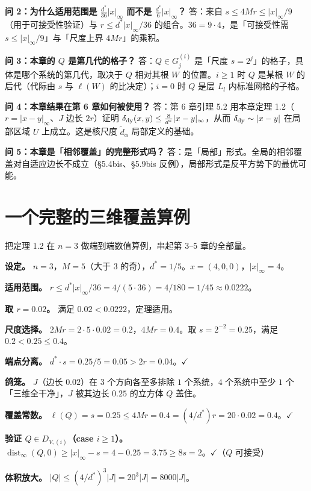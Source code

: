 \documentclass[a4paper,11pt,openany]{ctexbook}
\numberwithin{equation}{chapter}
\numberwithin{figure}{chapter}
\numberwithin{table}{chapter}
\begin{document}
\textbf{问 2：为什么适用范围是 $\frac{d^*}{36}|x|_\infty$ 而不是 $\frac{d^*}{6}|x|_\infty$？} 答：来自 $s\le4Mr\le|x|_\infty/9$（用于可接受性验证）与 $r\le d^*|x|_\infty/36$ 的组合。$36=9\cdot4$，是「可接受性需 $s\le|x|_\infty/9$」与「尺度上界 $4Mr$」的乘积。

\textbf{问 3：本章的 $Q$ 是第几代的格子？} 答：$Q\in G_j^{(i)}$ 是「尺度 $s=2^j$」的格子，具体是哪个系统的第几代，取决于 $Q$ 相对其根 $W$ 的位置。$i\ge1$ 时 $Q$ 是某根 $W$ 的后代（代际由 $s$ 与 $\ell(W)$ 的比决定）；$i=0$ 时 $Q$ 是层 $L_l$ 内标准网格的子格。

\textbf{问 4：本章结果在第 6 章如何被使用？} 答：第 6 章引理 5.2 用本章定理 1.2（$r=|x-y|_\infty$、$J$ 边长 $2r$）证明 $\delta_{\rm dy}(x,y)\le\frac8{d^*}|x-y|_\infty$，从而 $\delta_{\rm dy}\sim|x-y|$ 在局部区域 $U$ 上成立。这是核尺度 $\widetilde d_\alpha$ 局部定义的基础。

\textbf{问 5：本章是「相邻覆盖」的完整形式吗？} 答：是「局部」形式。全局的相邻覆盖对自适应边长不成立（§5.4bis、§5.9bis 反例），局部形式是反平方势下的最优可能。

\section{一个完整的三维覆盖算例}

把定理 1.2 在 $n=3$ 做端到端数值算例，串起第 3–5 章的全部量。

\textbf{设定。} $n=3$，$M=5$（大于 $3$ 的奇），$d^*=1/5$。$x=(4,0,0)$，$|x|_\infty=4$。

\textbf{适用范围。} $r\le d^*|x|_\infty/36=4/(5\cdot36)=4/180=1/45\approx0.0222$。

\textbf{取 $r=0.02$。} 满足 $0.02<0.0222$，定理适用。

\textbf{尺度选择。} $2Mr=2\cdot5\cdot0.02=0.2$，$4Mr=0.4$。取 $s=2^{-2}=0.25$，满足 $0.2<0.25\le0.4$。

\textbf{端点分离。} $d^*\cdot s=0.25/5=0.05>2r=0.04$。$\checkmark$

\textbf{鸽笼。} $J$（边长 $0.02$）在 $3$ 个方向各至多排除 $1$ 个系统，$4$ 个系统中至少 $1$ 个「三维全干净」，$J$ 被其边长 $0.25$ 的立方体 $Q$ 盖住。

\textbf{覆盖常数。} $\ell(Q)=s=0.25\le4Mr=0.4=(4/d^*)r=20\cdot0.02=0.4$。$\checkmark$

\textbf{验证 $Q\in D_{V,(i)}$（case $i\ge1$）。} $\operatorname{dist}_\infty(Q,0)\ge|x|_\infty-s=4-0.25=3.75\ge8s=2$。$\checkmark$（$Q$ 可接受）

\textbf{体积放大。} $|Q|\le(4/d^*)^3|J|=20^3|J|=8000|J|$。
\end{document}
